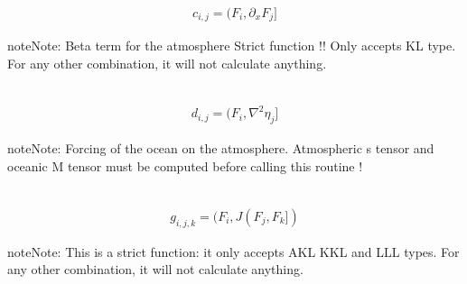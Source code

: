 \documentclass[letterpaper,10pt,english]{sphinxmanual}
\begin{document}
\begin{fulllineitems}
\begin{fulllineitems}
\end{fulllineitems}


\begin{fulllineitems}
\label{rstfiles/inprod_analytic:inprod_analytic.atm_tensors.calculate_c_atm}~\begin{equation*}
\begin{split}c_{i,j} = (F_i, \partial_x F_j]\end{split}
\end{equation*}
\begin{notice}{note}{Note:}
Beta term for the atmosphere
Strict function !! Only accepts KL type.
For any other combination, it will not calculate anything.
\end{notice}

\end{fulllineitems}


\begin{fulllineitems}
\label{rstfiles/inprod_analytic:inprod_analytic.atm_tensors.calculate_d}~\begin{equation*}
\begin{split}d_{i,j} = (F_i, \nabla^2 \eta_j]\end{split}
\end{equation*}
\begin{notice}{note}{Note:}
Forcing of the ocean on the atmosphere.
Atmospheric s tensor and oceanic M tensor must be computed 
before calling this routine !
\end{notice}

\end{fulllineitems}


\begin{fulllineitems}
\label{rstfiles/inprod_analytic:inprod_analytic.atm_tensors.calculate_g}~\begin{equation*}
\begin{split}g_{i,j,k} = (F_i, J(F_j, F_k])\end{split}
\end{equation*}
\begin{notice}{note}{Note:}
This is a strict function: it only accepts AKL KKL and LLL types.
For any other combination, it will not calculate anything.
\end{notice}


\end{fulllineitems}
\end{fulllineitems}
\end{document}
